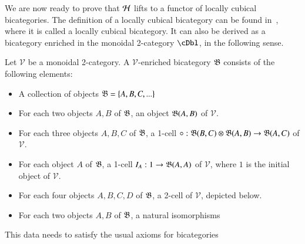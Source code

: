We are now ready to prove that $\mathcal{H}$ lifts to a functor of locally cubical bicategories. The definition of a locally cubical bicategory can be found in~\cite{gg:ldstr-tricat}, where it is called a locally cubical bicategory. It can also be derived as a bicategory enriched in the monoidal 2-category $\cDbl$, in the following sense.

\begin{defn}\label{def:lcbc}
Let $\mathcal{V}$ be a monoidal 2-category. A $\mathcal{V}$-enriched bicategory $\mathfrak{B}$ consists of the following elements:
\begin{itemize}
\item A collection of objects $\mathfrak{B}=\{A,B,C,...\} $
\item For each two objects $A,B$ of $\mathfrak{B}$, an object $\mathfrak{B}(A,B)$ of $\mathcal{V}$. 
\item For each three objects $A, B, C$ of $\mathfrak{B}$, a 1-cell  $\circ: \mathfrak{B}(B,C) \otimes \mathfrak{B}(A,B) \rightarrow \mathfrak{B}(A,C)$ of $\mathcal{V}$. 
\item For each object $A$ of $\mathfrak{B}$, a 1-cell \newline $I_A: 1 \rightarrow \mathfrak{B}(A,A)$ of $\mathcal{V}$, where $1$ is the initial object of $\mathcal{V}$. 
\item For each four objects $A,B,C,D$ of $\mathfrak{B}$, a 2-cell of $\mathcal{V}$, depicted below. 
  \begin{center}
    
    \end{center}
\item For each two objects $A,B$ of $\mathfrak{B}$, a natural isomorphisms 
  \begin{center}
    
    \end{center}
 \end{itemize}
This data needs to satisfy the usual axioms for bicategories~\cite{maclane}
\end{defn}

